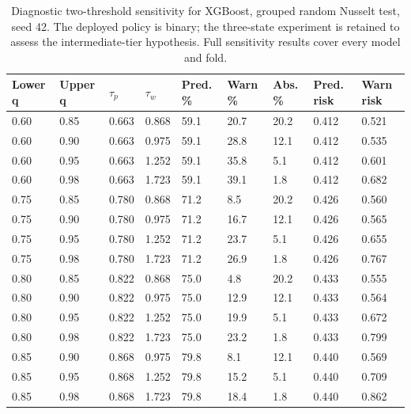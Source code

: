 \begin{table}[htbp]\centering\scriptsize\caption{Diagnostic two-threshold sensitivity for XGBoost, grouped random Nusselt test, seed 42. The deployed policy is binary; the three-state experiment is retained to assess the intermediate-tier hypothesis. Full sensitivity results cover every model and fold.}\label{tab:sensitivity}
\begin{tabular}{lllllllll}\toprule
Lower q & Upper q & $\tau_p$ & $\tau_w$ & Pred. \% & Warn \% & Abs. \% & Pred. risk & Warn risk\\\midrule
0.60 & 0.85 & 0.663 & 0.868 & 59.1 & 20.7 & 20.2 & 0.412 & 0.521\\
0.60 & 0.90 & 0.663 & 0.975 & 59.1 & 28.8 & 12.1 & 0.412 & 0.535\\
0.60 & 0.95 & 0.663 & 1.252 & 59.1 & 35.8 & 5.1 & 0.412 & 0.601\\
0.60 & 0.98 & 0.663 & 1.723 & 59.1 & 39.1 & 1.8 & 0.412 & 0.682\\
0.75 & 0.85 & 0.780 & 0.868 & 71.2 & 8.5 & 20.2 & 0.426 & 0.560\\
0.75 & 0.90 & 0.780 & 0.975 & 71.2 & 16.7 & 12.1 & 0.426 & 0.565\\
0.75 & 0.95 & 0.780 & 1.252 & 71.2 & 23.7 & 5.1 & 0.426 & 0.655\\
0.75 & 0.98 & 0.780 & 1.723 & 71.2 & 26.9 & 1.8 & 0.426 & 0.767\\
0.80 & 0.85 & 0.822 & 0.868 & 75.0 & 4.8 & 20.2 & 0.433 & 0.555\\
0.80 & 0.90 & 0.822 & 0.975 & 75.0 & 12.9 & 12.1 & 0.433 & 0.564\\
0.80 & 0.95 & 0.822 & 1.252 & 75.0 & 19.9 & 5.1 & 0.433 & 0.672\\
0.80 & 0.98 & 0.822 & 1.723 & 75.0 & 23.2 & 1.8 & 0.433 & 0.799\\
0.85 & 0.90 & 0.868 & 0.975 & 79.8 & 8.1 & 12.1 & 0.440 & 0.569\\
0.85 & 0.95 & 0.868 & 1.252 & 79.8 & 15.2 & 5.1 & 0.440 & 0.709\\
0.85 & 0.98 & 0.868 & 1.723 & 79.8 & 18.4 & 1.8 & 0.440 & 0.862\\
\bottomrule\end{tabular}\end{table}
